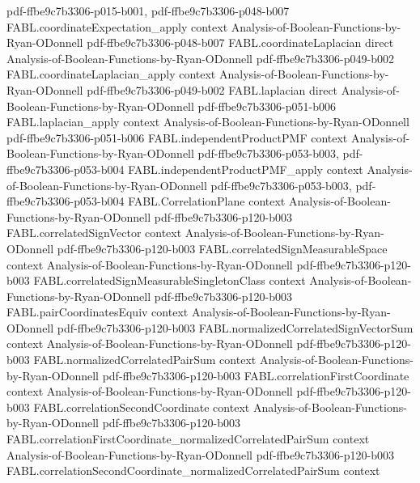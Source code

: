 \begin{theorem}
  {pdf-ffbe9c7b3306-p015-b001,
    pdf-ffbe9c7b3306-p048-b007}
\proofstep
  {FABL.coordinateExpectation_apply}
  {context}
  {Analysis-of-Boolean-Functions-by-Ryan-ODonnell}
  {pdf-ffbe9c7b3306-p048-b007}
\proofstep
  {FABL.coordinateLaplacian}
  {direct}
  {Analysis-of-Boolean-Functions-by-Ryan-ODonnell}
  {pdf-ffbe9c7b3306-p049-b002}
\proofstep
  {FABL.coordinateLaplacian_apply}
  {context}
  {Analysis-of-Boolean-Functions-by-Ryan-ODonnell}
  {pdf-ffbe9c7b3306-p049-b002}
\proofstep
  {FABL.laplacian}
  {direct}
  {Analysis-of-Boolean-Functions-by-Ryan-ODonnell}
  {pdf-ffbe9c7b3306-p051-b006}
\proofstep
  {FABL.laplacian_apply}
  {context}
  {Analysis-of-Boolean-Functions-by-Ryan-ODonnell}
  {pdf-ffbe9c7b3306-p051-b006}
\proofstep
  {FABL.independentProductPMF}
  {context}
  {Analysis-of-Boolean-Functions-by-Ryan-ODonnell}
  {pdf-ffbe9c7b3306-p053-b003,
    pdf-ffbe9c7b3306-p053-b004}
\proofstep
  {FABL.independentProductPMF_apply}
  {context}
  {Analysis-of-Boolean-Functions-by-Ryan-ODonnell}
  {pdf-ffbe9c7b3306-p053-b003,
    pdf-ffbe9c7b3306-p053-b004}
\proofstep
  {FABL.CorrelationPlane}
  {context}
  {Analysis-of-Boolean-Functions-by-Ryan-ODonnell}
  {pdf-ffbe9c7b3306-p120-b003}
\proofstep
  {FABL.correlatedSignVector}
  {context}
  {Analysis-of-Boolean-Functions-by-Ryan-ODonnell}
  {pdf-ffbe9c7b3306-p120-b003}
\proofstep
  {FABL.correlatedSignMeasurableSpace}
  {context}
  {Analysis-of-Boolean-Functions-by-Ryan-ODonnell}
  {pdf-ffbe9c7b3306-p120-b003}
\proofstep
  {FABL.correlatedSignMeasurableSingletonClass}
  {context}
  {Analysis-of-Boolean-Functions-by-Ryan-ODonnell}
  {pdf-ffbe9c7b3306-p120-b003}
\proofstep
  {FABL.pairCoordinatesEquiv}
  {context}
  {Analysis-of-Boolean-Functions-by-Ryan-ODonnell}
  {pdf-ffbe9c7b3306-p120-b003}
\proofstep
  {FABL.normalizedCorrelatedSignVectorSum}
  {context}
  {Analysis-of-Boolean-Functions-by-Ryan-ODonnell}
  {pdf-ffbe9c7b3306-p120-b003}
\proofstep
  {FABL.normalizedCorrelatedPairSum}
  {context}
  {Analysis-of-Boolean-Functions-by-Ryan-ODonnell}
  {pdf-ffbe9c7b3306-p120-b003}
\proofstep
  {FABL.correlationFirstCoordinate}
  {context}
  {Analysis-of-Boolean-Functions-by-Ryan-ODonnell}
  {pdf-ffbe9c7b3306-p120-b003}
\proofstep
  {FABL.correlationSecondCoordinate}
  {context}
  {Analysis-of-Boolean-Functions-by-Ryan-ODonnell}
  {pdf-ffbe9c7b3306-p120-b003}
\proofstep
  {FABL.correlationFirstCoordinate_normalizedCorrelatedPairSum}
  {context}
  {Analysis-of-Boolean-Functions-by-Ryan-ODonnell}
  {pdf-ffbe9c7b3306-p120-b003}
\proofstep
  {FABL.correlationSecondCoordinate_normalizedCorrelatedPairSum}
  {context}

\end{theorem}
